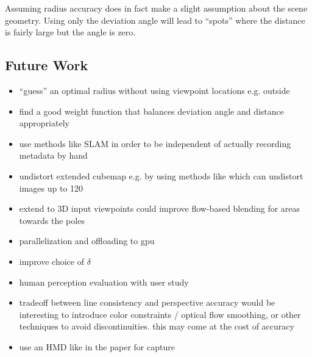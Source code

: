 Assuming radius accuracy does in fact make a slight assumption about the scene geometry. Using only the deviation angle will lead to ``spots'' where the distance is fairly large but the angle is zero. 

\subsection{Future Work}
\begin{itemize}
  \item ``guess'' an optimal radius without using viewpoint locations e.g. outside
  \item find a good weight function that balances deviation angle and distance appropriately
  \item use methods like SLAM in order to be independent of actually recording metadata by hand
  \item undistort extended cubemap e.g. by using methods like \cite{fov} which can undistort images up to 120\degree
  \item extend to 3D \ar input viewpoints could improve flow-based blending for areas towards the poles
  \item parallelization and offloading to gpu
  \item improve choice of $\delta$
  \item human perception evaluation with user study
  \item tradeoff between line consistency and perspective accuracy \ar would be interesting to introduce color constraints / optical flow smoothing, or other techniques to avoid discontinuities. this may come at the cost of accuracy
  \item use an HMD like in the paper for capture
\end{itemize}

